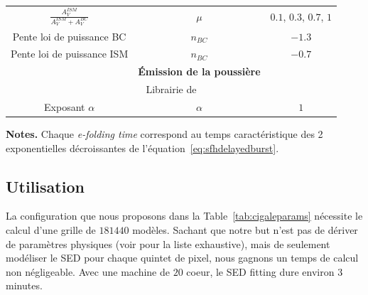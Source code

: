 \documentclass[../main/main.tex]{subfiles}
\begin{document}
\begin{table}[h]
{\begin{tabularx}{1.2\textwidth}{ccc}
                               $\frac{A_{V}^{ISM}}{A_{V}^{ISM}+A_{V}^{BC}}$
                                                   & $\mu$ & $0.1$,
                                                             $0.3$,
                                                             $0.7$,
                                                             $1$\\
                               Pente loi de puissance BC & $n_{BC}$&
                                                                     $-1.3$\\
                               Pente loi de puissance ISM & $n_{BC}$& $-0.7$\\
                               \hline
                                                   & \textbf{\'Emission
                                                     de la
                                                     poussière}&\\
                               \multicolumn{3}{c}{Librairie de \citet{Dale2014}}\hspace{-1.1cm}\\
                               \hline
                               Exposant $\alpha$ & $\alpha$ & $1$\\

                               \bottomrule
        \end{tabularx}}
        \begin{tablenotes}[flushleft]
        \item \textbf{Notes.} Chaque \textit{e-folding time} correspond au
          temps caractéristique des 2 exponentielles décroissantes de
          l'équation~\ref{eq:sfhdelayedburst}. 
        \end{tablenotes}
      
    \end{table}
    
\subsection{Utilisation}
    
La configuration que nous proposons dans la Table~\ref{tab:cigaleparams}
nécessite le calcul d'une grille de $181440$ modèles. Sachant que notre
but n'est pas de dériver de paramètres physiques (voir
\citet{Boquien2019} pour la liste exhaustive), mais de seulement modéliser le
SED pour chaque quintet de pixel, nous
gagnons un temps de calcul non négligeable. 
Avec une machine de $20$ coeur, le SED fitting dure environ $3$ minutes.
\end{document}
